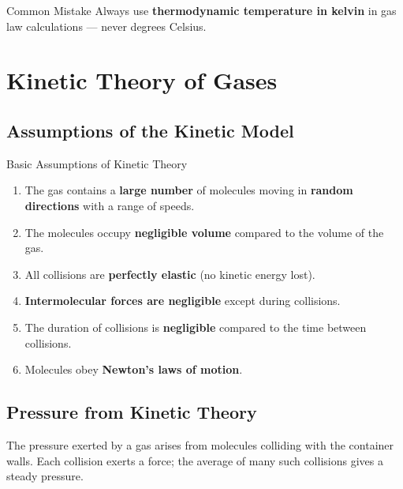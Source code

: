 \begin{warningbox}{Common Mistake}
Always use \textbf{thermodynamic temperature in kelvin} in gas law calculations --- never degrees Celsius.
\end{warningbox}

\section{Kinetic Theory of Gases}

\subsection{Assumptions of the Kinetic Model}

\begin{keybox}{Basic Assumptions of Kinetic Theory}
\begin{enumerate}[itemsep=3pt]
  \item The gas contains a \textbf{large number} of molecules moving in \textbf{random directions} with a range of speeds.
  \item The molecules occupy \textbf{negligible volume} compared to the volume of the gas.
  \item All collisions are \textbf{perfectly elastic} (no kinetic energy lost).
  \item \textbf{Intermolecular forces are negligible} except during collisions.
  \item The duration of collisions is \textbf{negligible} compared to the time between collisions.
  \item Molecules obey \textbf{Newton's laws of motion}.
\end{enumerate}
\end{keybox}

\subsection{Pressure from Kinetic Theory}

The pressure exerted by a gas arises from molecules colliding with the container walls. Each collision exerts a force; the average of many such collisions gives a steady pressure.
\usetikzlibrary{quotes,arrows,arrows.meta}
\tikzset{>=latex} %




